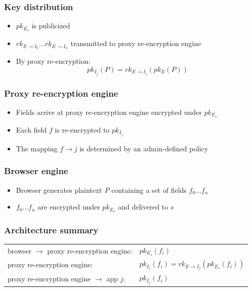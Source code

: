 \documentclass{beamer}
\begin{document}
\begin{frame}
\frametitle{Key distribution}
\begin{itemize}
\item $pk_{E_s}$ is publicized
\item $rk_{E \to I_0}...rk_{E \to I_n}$ transmitted to \alert{proxy
re-encryption engine}
\item By proxy re-encryption:
\begin{equation*}
pk_{I_j}(P) = rk_{E \to I_j}( pk_E (P))
\end{equation*}
\end{itemize}
\end{frame}

\begin{frame}
\frametitle{Proxy re-encryption engine}
\begin{itemize}
\item Fields arrive at proxy re-encryption engine encrypted under $pk_{E_s}$
\item Each field $f$ is re-encrypted to $pk_{I_j}$
\item The mapping $f \to j$ is determined by an admin-defined policy
\end{itemize}
\end{frame}

\begin{frame}
\frametitle{Browser engine}
\begin{itemize}
\item \alert{Browser} generates plaintext $P$ containing a set of fields
$f_0...f_n$
\item $f_0...f_n$ are encrypted under $pk_{E_s}$ and delivered to $s$
\end{itemize}
\end{frame}


\begin{frame}
\frametitle{Architecture summary}
\begin{tabular}{ll}
browser $\to$ proxy re-encryption engine: & $pk_{E_s}(f_i)$ \\
proxy re-encryption engine: & $pk_{I_j}(f_i) = rk_{E \to I_j}(pk_{E_s}(f_i))$ \\
proxy re-encryption engine $\to$ app $j$: & $pk_{I_j}(f_i)$ \\
\end{tabular}
\end{frame}
\end{document}
